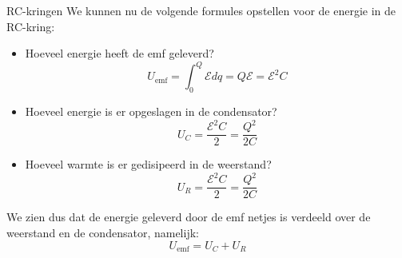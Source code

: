 \begin{app}[RC-kringen]{RC-kringen}
    \noindent We kunnen nu de volgende formules opstellen voor de energie in de RC-kring:
    \begin{itemize}
        \item Hoeveel energie heeft de emf geleverd? 
        \begin{equation*}
            U_{\text{emf}} = \int_0^Q \mathcal{E} dq = Q\mathcal{E} = \mathcal{E}^2C
        \end{equation*}
        \item Hoeveel energie is er opgeslagen in de condensator?
        \begin{equation*}
            U_{C} = \dfrac{\mathcal{E}^2C}{2} = \dfrac{Q^2}{2C}
        \end{equation*}
        \item Hoeveel warmte is er gedisipeerd in de weerstand?
        \begin{equation*}
            U_{R} = \dfrac{\mathcal{E}^2C}{2} = \dfrac{Q^2}{2C}
        \end{equation*}
    \end{itemize}
    We zien dus dat de energie geleverd door de emf netjes is verdeeld over de weerstand en de condensator, namelijk:
    \begin{equation*}
        U_{\text{emf}} = U_{C} + U_{R}
    \end{equation*}
\end{app}

